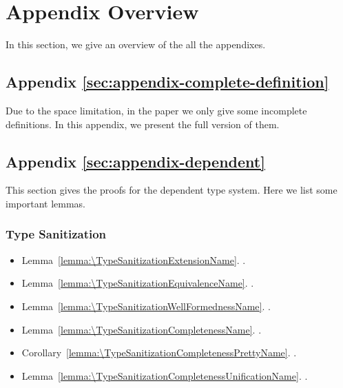 \clearpage

\section{Appendix Overview}

In this section, we give an overview of the all the appendixes.

\subsection{Appendix \ref{sec:appendix-complete-definition}}

Due to the space limitation, in the paper we only give some incomplete
definitions. In this appendix, we present the full version of them.

\subsection{Appendix \ref{sec:appendix-dependent}}

This section gives the proofs for the dependent type system.
Here we list some important lemmas.

\subsubsection{Type Sanitization}
\begin{itemize}
\item Lemma~\ref{lemma:\TypeSanitizationExtensionName}.
  \TypeSanitizationExtensionName.\\
  \TypeSanitizationExtensionBody
\item Lemma~\ref{lemma:\TypeSanitizationEquivalenceName}.
  \TypeSanitizationEquivalenceName.\\
  \TypeSanitizationEquivalenceBody
\item Lemma~\ref{lemma:\TypeSanitizationWellFormednessName}.
  \TypeSanitizationWellFormednessName.\\
  \TypeSanitizationWellFormednessBody
\item Lemma~\ref{lemma:\TypeSanitizationCompletenessName}.
  \TypeSanitizationCompletenessName.\\
  \TypeSanitizationCompletenessBody
\item Corollary~\ref{lemma:\TypeSanitizationCompletenessPrettyName}.
  \TypeSanitizationCompletenessPrettyName.\\
  \TypeSanitizationCompletenessPrettyBody
\item Lemma~\ref{lemma:\TypeSanitizationCompletenessUnificationName}.
  \TypeSanitizationCompletenessUnificationName.\\
  \TypeSanitizationCompletenessUnificationBody
\end{itemize}

